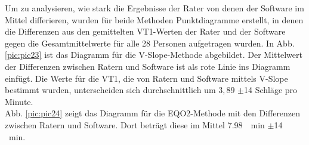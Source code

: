 %
Um zu analysieren, wie stark die Ergebnisse der Rater von denen der Software im Mittel differieren, wurden für beide Methoden Punktdiagramme erstellt, in denen die Differenzen aus den gemittelten VT1-Werten der Rater und der Software gegen die Gesamtmittelwerte für alle 28 Personen aufgetragen wurden. In Abb. \ref{pic:pic23} ist das Diagramm für die V-Slope-Methode abgebildet. Der Mittelwert der Differenzen zwischen Ratern und Software ist als rote Linie ins Diagramm einfügt. Die Werte für die VT1, die von Ratern und Software mittels V-Slope bestimmt wurden, unterscheiden sich durchschnittlich um $3,89$ $\pm$14 Schläge pro Minute.\\
Abb. \ref{pic:pic24} zeigt das Diagramm für die \gls{EQO2}-Methode mit den Differenzen zwischen Ratern und Software. Dort beträgt diese im Mittel \SI{7,98}{\per\minute} $\pm$14 \si{\per\minute}.
%
